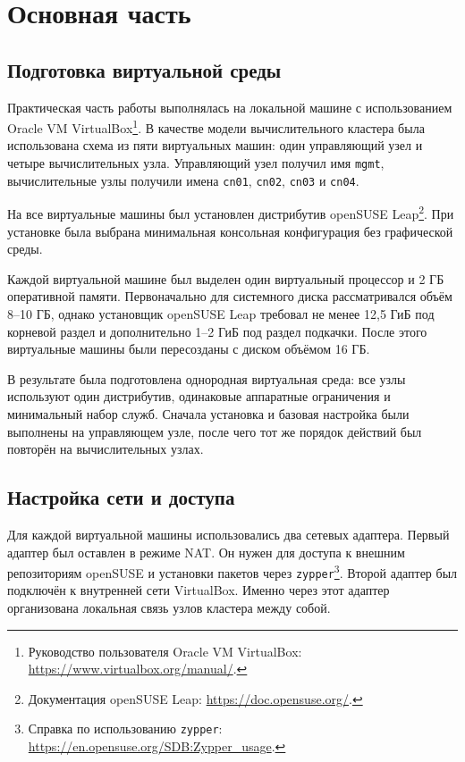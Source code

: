 \section{Основная часть}

\subsection{Подготовка виртуальной среды}

Практическая часть работы выполнялась на локальной машине с использованием Oracle VM VirtualBox\footnote{Руководство пользователя Oracle VM VirtualBox: \url{https://www.virtualbox.org/manual/}.}. В качестве модели вычислительного кластера была использована схема из пяти виртуальных машин: один управляющий узел и четыре вычислительных узла. Управляющий узел получил имя \texttt{mgmt}, вычислительные узлы получили имена \texttt{cn01}, \texttt{cn02}, \texttt{cn03} и \texttt{cn04}.

На все виртуальные машины был установлен дистрибутив openSUSE Leap\footnote{Документация openSUSE Leap: \url{https://doc.opensuse.org/}.}. При установке была выбрана минимальная консольная конфигурация без графической среды.

Каждой виртуальной машине был выделен один виртуальный процессор и 2 ГБ оперативной памяти. Первоначально для системного диска рассматривался объём 8--10 ГБ, однако установщик openSUSE Leap требовал не менее 12,5 ГиБ под корневой раздел и дополнительно 1--2 ГиБ под раздел подкачки. После этого виртуальные машины были пересозданы с диском объёмом 16 ГБ.

В результате была подготовлена однородная виртуальная среда: все узлы используют один дистрибутив, одинаковые аппаратные ограничения и минимальный набор служб. Сначала установка и базовая настройка были выполнены на управляющем узле, после чего тот же порядок действий был повторён на вычислительных узлах.

\subsection{Настройка сети и доступа}

Для каждой виртуальной машины использовались два сетевых адаптера. Первый адаптер был оставлен в режиме NAT. Он нужен для доступа к внешним репозиториям openSUSE и установки пакетов через \texttt{zypper}\footnote{Справка по использованию \texttt{zypper}: \url{https://en.opensuse.org/SDB:Zypper_usage}.}. Второй адаптер был подключён к внутренней сети VirtualBox. Именно через этот адаптер организована локальная связь узлов кластера между собой.

